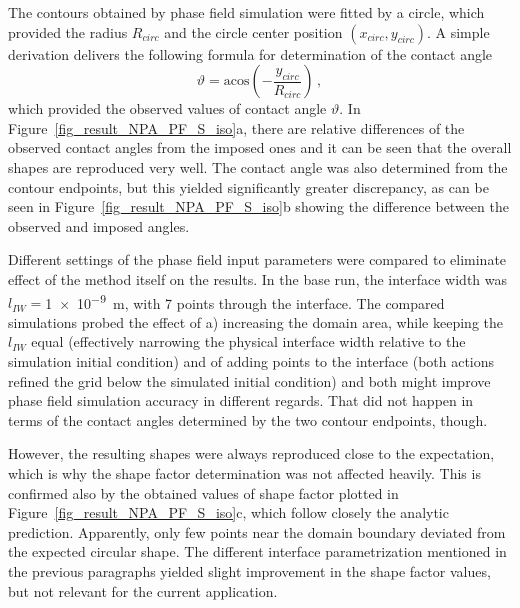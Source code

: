 	The contours obtained by phase field simulation were fitted by a circle, which provided the radius $R_{circ}$ and the circle center position $(x_{circ},y_{circ})$. A simple derivation delivers the following formula for determination of the contact angle 
	\begin{equation}
		\vartheta = \mathrm{acos}\left(-\frac{y_{circ}}{R_{circ}}\right) \,,
	\end{equation}
	which provided the observed values of contact angle $\vartheta$. In Figure~\ref{fig_result_NPA_PF_S_iso}a, there are relative differences of the observed contact angles from the imposed ones and it can be seen that the overall shapes are reproduced very well. The contact angle was also determined from the contour endpoints, but this yielded significantly greater discrepancy, as can be seen in Figure~\ref{fig_result_NPA_PF_S_iso}b showing the difference between the observed and imposed angles. 
	
	Different settings of the phase field input parameters were compared to eliminate effect of the method itself on the results. In the base run, the interface width was $l_{IW}=$\qty{1e-9}{\m}, with 7 points through the interface. The compared simulations probed the effect of a) increasing the domain area, while keeping the $l_{IW}$ equal (effectively narrowing the physical interface width relative to the simulation initial condition) and of adding points to the interface (both actions refined the grid below the simulated initial condition) and both might improve phase field simulation accuracy in different regards. That did not happen in terms of the contact angles determined by the two contour endpoints, though.
	
	However, the resulting shapes were always reproduced close to the expectation, which is why the shape factor determination was not affected heavily. This is confirmed also by the obtained values of shape factor plotted in Figure~\ref{fig_result_NPA_PF_S_iso}c, which follow closely the analytic prediction. Apparently, only few points near the domain boundary deviated from the expected circular shape. The different interface parametrization mentioned in the previous paragraphs yielded slight improvement in the shape factor values, but not relevant for the current application.
	
